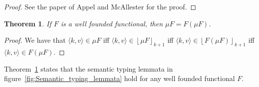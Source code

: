 \documentclass[12pt,a4paper,draft]{article}
\theoremstyle{definition}
\theoremstyle{plain}
\newtheorem{theorem}[definition]{Theorem}
\newcommand{\pair}[1]{\ensuremath{\langle{#1}\rangle}}
\newcommand{\floor}[1]{\ensuremath{\left\lfloor{#1}\right\rfloor}}
\begin{document}
\begin{proof}
  See the paper of Appel and McAllester \cite{Appel01} for the proof.
\end{proof}

\begin{theorem} \label{thm:Well_founded_fixpoint}
  If $F$ is a well founded functional, then $\mu F = F(\mu F)$.
\end{theorem}

\begin{proof}
  We have that $\pair{k,v} \in \mu F$ iff $\pair{k,v} \in \floor{\mu F}_{k+1}$
  iff $\pair{k,v} \in \floor{F \left(\mu F\right)}_{k+1}$ iff
  $\pair{k,v} \in F \left(\mu F\right)$.
\end{proof}

Theorem~\ref{thm:Well_founded_fixpoint} states that the semantic typing
lemmata in figure~\ref{fig:Semantic_typing_lemmata} hold for any well
founded functional $F$.




\end{document}
